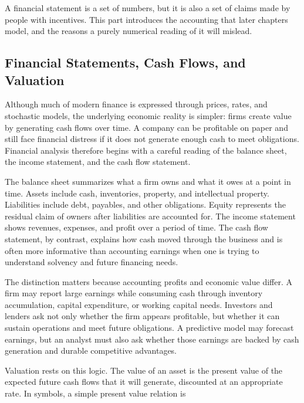 \documentclass[../ai_in_finance]{subfiles}
\begin{document}
A financial statement is a set of numbers, but it is also a set of claims made by people with incentives. This part introduces the accounting that later chapters model, and the reasons a purely numerical reading of it will mislead.

\subsection{Financial Statements, Cash Flows, and Valuation}

Although much of modern finance is expressed through prices, rates, and stochastic models, the underlying economic reality is simpler: firms create value by generating cash flows over time. A company can be profitable on paper and still face financial distress if it does not generate enough cash to meet obligations. Financial analysis therefore begins with a careful reading of the balance sheet, the income statement, and the cash flow statement.

The balance sheet summarizes what a firm owns and what it owes at a point in time. Assets include cash, inventories, property, and intellectual property. Liabilities include debt, payables, and other obligations. Equity represents the residual claim of owners after liabilities are accounted for. The income statement shows revenues, expenses, and profit over a period of time. The cash flow statement, by contrast, explains how cash moved through the business and is often more informative than accounting earnings when one is trying to understand solvency and future financing needs.

The distinction matters because accounting profits and economic value differ. A firm may report large earnings while consuming cash through inventory accumulation, capital expenditure, or working capital needs. Investors and lenders ask not only whether the firm appears profitable, but whether it can sustain operations and meet future obligations. A predictive model may forecast earnings, but an analyst must also ask whether those earnings are backed by cash generation and durable competitive advantages.

Valuation rests on this logic. The value of an asset is the present value of the expected future cash flows that it will generate, discounted at an appropriate rate. In symbols, a simple present value relation is
\end{document}
